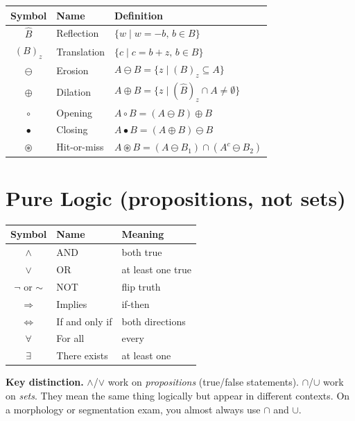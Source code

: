 \documentclass[11pt]{article}
\begin{document}
\begin{tcolorbox}[refbox]
\begin{tabular}{@{}cll@{}}
\toprule
\textbf{Symbol} & \textbf{Name} & \textbf{Definition} \\
\midrule
$\hat{B}$ & Reflection & $\{w \mid w = -b,\, b \in B\}$ \\
$(B)_z$ & Translation & $\{c \mid c = b + z,\, b \in B\}$ \\
$\ominus$ & Erosion & $A \ominus B = \{z \mid (B)_z \subseteq A\}$ \\
$\oplus$ & Dilation & $A \oplus B = \{z \mid (\hat{B})_z \cap A \ne \emptyset\}$ \\
$\circ$ & Opening & $A \circ B = (A \ominus B) \oplus B$ \\
$\bullet$ & Closing & $A \bullet B = (A \oplus B) \ominus B$ \\
$\circledast$ & Hit-or-miss & $A \circledast B = (A \ominus B_1) \cap (A^c \ominus B_2)$ \\
\bottomrule
\end{tabular}
\end{tcolorbox}

\section{Pure Logic (propositions, not sets)}

\begin{tcolorbox}[refbox]
\begin{tabular}{@{}cll@{}}
\toprule
\textbf{Symbol} & \textbf{Name} & \textbf{Meaning} \\
\midrule
$\wedge$ & AND & both true \\
$\vee$ & OR & at least one true \\
$\neg$ or $\sim$ & NOT & flip truth \\
$\Rightarrow$ & Implies & if-then \\
$\Leftrightarrow$ & If and only if & both directions \\
$\forall$ & For all & every \\
$\exists$ & There exists & at least one \\
\bottomrule
\end{tabular}
\end{tcolorbox}

\textbf{Key distinction.} $\wedge$/$\vee$ work on \emph{propositions} (true/false statements). $\cap$/$\cup$ work on \emph{sets}. They mean the same thing logically but appear in different contexts. On a morphology or segmentation exam, you almost always use $\cap$ and $\cup$.
\end{document}

